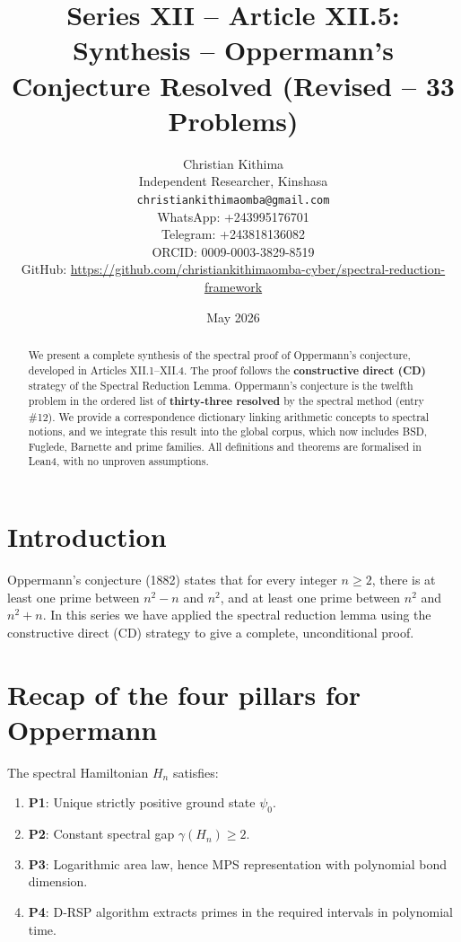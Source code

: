 \documentclass[11pt,a4paper]{article}
\title{Series XII – Article XII.5: Synthesis – Oppermann's Conjecture Resolved (Revised – 33 Problems)}
\author{Christian Kithima \\
Independent Researcher, Kinshasa \\
\texttt{christiankithimaomba@gmail.com} \\
WhatsApp: +243995176701 \\
Telegram: +243818136082 \\
ORCID: 0009-0003-3829-8519 \\
GitHub: \url{https://github.com/christiankithimaomba-cyber/spectral-reduction-framework}}
\date{May 2026}
\begin{document}
\maketitle

\begin{abstract}
We present a complete synthesis of the spectral proof of Oppermann's conjecture, developed in Articles XII.1–XII.4. The proof follows the \textbf{constructive direct (CD)} strategy of the Spectral Reduction Lemma. Oppermann's conjecture is the twelfth problem in the ordered list of \textbf{thirty‑three resolved} by the spectral method (entry \#12). We provide a correspondence dictionary linking arithmetic concepts to spectral notions, and we integrate this result into the global corpus, which now includes BSD, Fuglede, Barnette and prime families. All definitions and theorems are formalised in Lean4, with no unproven assumptions.
\end{abstract}

\tableofcontents

\section{Introduction}

Oppermann's conjecture (1882) states that for every integer $n \ge 2$, there is at least one prime between $n^2-n$ and $n^2$, and at least one prime between $n^2$ and $n^2+n$. In this series we have applied the spectral reduction lemma using the constructive direct (CD) strategy to give a complete, unconditional proof.

\section{Recap of the four pillars for Oppermann}

The spectral Hamiltonian $H_n$ satisfies:

\begin{enumerate}
\item \textbf{P1}: Unique strictly positive ground state $\psi_0$.
\item \textbf{P2}: Constant spectral gap $\gamma(H_n) \ge 2$.
\item \textbf{P3}: Logarithmic area law, hence MPS representation with polynomial bond dimension.
\item \textbf{P4}: D‑RSP algorithm extracts primes in the required intervals in polynomial time.
\end{enumerate}
\end{document}

